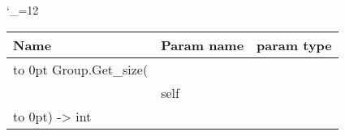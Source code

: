 \begingroup \catcode`\_=12 \tt
\begin{tabular}{lll}
\toprule
\textrm{Name}&\textrm{Param name}&\textrm{param type}\\
\midrule
\hbox to 0pt {Group.Get_size(\hss}\\
& self\\
\hbox to 0pt{) -> int\hss}\\
\bottomrule
\end{tabular}
\endgroup
